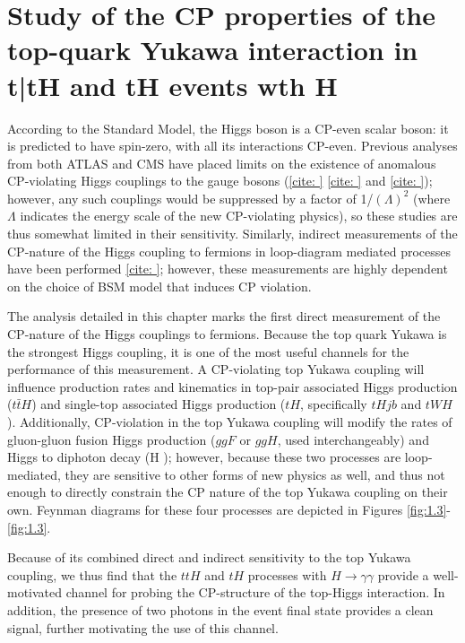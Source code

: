 \section{Study of the CP properties of the top-quark Yukawa interaction in t\bar{t}H and tH events wth H \rightarrow \gamma \gamma} \label{sec:ttHCP}

According to the Standard Model, the Higgs boson is a CP-even scalar boson: it is predicted to have spin-zero, with all its interactions CP-even. Previous analyses from both ATLAS and CMS have placed limits on the existence of anomalous CP-violating Higgs couplings to the gauge bosons (\ref{cite: } \ref{cite: } and \ref{cite: }); however, any such couplings would be suppressed by a factor of 1/$(\Lambda)^2$ (where $\Lambda$ indicates the energy scale of the new CP-violating physics), so these studies are thus somewhat limited in their sensitivity. Similarly, indirect measurements of the CP-nature of the Higgs coupling to fermions in loop-diagram mediated processes have been performed \ref{cite: }; however, these measurements are highly dependent on the choice of BSM model that induces CP violation.

The analysis detailed in this chapter marks the first direct measurement of the CP-nature of the Higgs couplings to fermions. Because the top quark Yukawa is the strongest Higgs coupling, it is one of the most useful channels for the performance of this measurement. A CP-violating top Yukawa coupling will influence production rates and kinematics in top-pair associated Higgs production ($t \bar{t} H$) and single-top associated Higgs production ($tH$, specifically $tHjb$ and $tWH$). Additionally, CP-violation in the top Yukawa coupling will modify the rates of gluon-gluon fusion Higgs production ($ggF$ or $ggH$, used interchangeably) and Higgs to diphoton decay (H \rightarrow \gamma \gamma); however, because these two processes are loop-mediated, they are sensitive to other forms of new physics as well, and thus not enough to directly constrain the CP nature of the top Yukawa coupling on their own. Feynman diagrams for these four processes are depicted in Figures \ref{fig:1.3}-\ref{fig:1.3}.

Because of its combined direct and indirect sensitivity to the top Yukawa coupling, we thus find that the $ttH$ and $tH$ processes with $H \rightarrow \gamma \gamma $ provide a well-motivated channel for probing the CP-structure of the top-Higgs interaction. In addition, the presence of two photons in the event final state provides a clean signal, further motivating the use of this channel.

